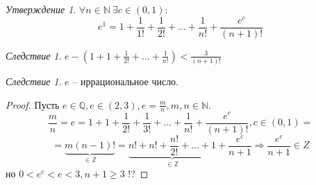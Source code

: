 \documentclass[12pt]{article}
\def\Q{\mathbb{Q}}       %
\def\N{\mathbb{N}}       %
\def\Z{\mathbb{Z}}       %
\def\SO{\Rightarrow}     %
\theoremstyle{definition} %
\theoremstyle{plain} %
\theoremstyle{remark} %
\newtheorem{Cons}[Thm]{Следствие} %
\newtheorem{Prop}[Thm]{Утверждение} %
\begin{document}
\begin{Prop}
    $\forall n \in \N \ \exists c \in (0, 1) : $
    \[e^1 = 1 + \frac{1}{1!} + \frac{1}{2!} + ... + \frac{1}{n!} + \frac{e^c}{(n + 1)!}\] 
\end{Prop}

\begin{Cons}
    $e - \left(1 + 1 + \frac{1}{2!} + ... + \frac{1}{n!}\right) < \frac{3}{(n + 1)!}$ 
\end{Cons}

\begin{Cons}
    $e$ -- иррациональное число.
\end{Cons}

\begin{proof}
    Пусть $e \in \Q, e \in (2, 3), e = \frac{m}{n}, m, n \in \N$.
    \[\frac{m}{n} = e = 1 + 1 + \frac{1}{2!} + \frac{1}{3!} + ... + \frac{1}{n!} + \frac{e^c}{(n + 1)!}, c \in (0, 1) = \]
    \[= \underbrace{m (n - 1)!}_{\in \Z} = \underbrace{n! + n! + \frac{n!}{2!} + ... + 1}_{\in \Z} + \frac{e^c}{n + 1} \SO \frac{e^c}{n + 1} \in Z\]
    но $0 < e^c < e < 3, n + 1 \geqslant 3$  !?
\end{proof}
\end{document}
